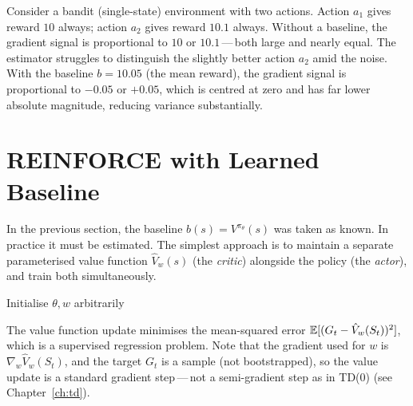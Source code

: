 \begin{example}
\label{ex:baseline-variance}
Consider a bandit (single-state) environment with two actions.  Action $a_1$ gives reward $10$ always; action $a_2$ gives reward $10.1$ always.  Without a baseline, the gradient signal is proportional to $10$ or $10.1$\,---\,both large and nearly equal.  The estimator struggles to distinguish the slightly better action $a_2$ amid the noise.  With the baseline $b = 10.05$ (the mean reward), the gradient signal is proportional to $-0.05$ or $+0.05$, which is centred at zero and has far lower absolute magnitude, reducing variance substantially.
\end{example}

\section{REINFORCE with Learned Baseline}
\label{sec:reinforce-baseline}


In the previous section, the baseline $b(s) = V^{\pi_\theta}(s)$ was taken as known.  In practice it must be estimated.  The simplest approach is to maintain a separate parameterised value function $\hat V_w(s)$ (the \emph{critic}) alongside the policy (the \emph{actor}), and train both simultaneously.

\begin{algorithm}[ht]
\caption{REINFORCE with Learned Baseline}
\label{alg:reinforce-baseline}
Initialise $\theta, w$ arbitrarily\;
\end{algorithm}

The value function update minimises the mean-squared error $\operatorname{\mathbb{E}}[(G_t - \hat V_w(S_t))^2]$, which is a supervised regression problem.  Note that the gradient used for $w$ is $\nabla_w \hat V_w(S_t)$, and the target $G_t$ is a sample (not bootstrapped), so the value update is a standard gradient step\,---\,not a semi-gradient step as in TD(0) (see Chapter~\ref{ch:td}).

